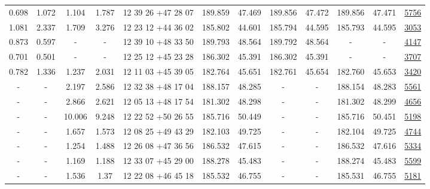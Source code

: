 \documentclass{article}
\begin{document}
\begin{landscape}
\begin{longtable}{c|c|c|c|c|c|c|c|c|c|c|c}
0.698 & 1.072 & 1.104 & 1.787 & 12 39 26 +47 28 07 &  189.859 & 47.469 &  189.856 & 47.472 & 189.856 & 47.471 & \href{http://banana.transientskp.org/r4/vlo_KmeulenSimSource/runningcatalog/5756}{5756}  \\
1.081 & 2.337 & 1.709 & 3.276 & 12 23 12 +44 36 02 &  185.802 & 44.601 &  185.794 & 44.595 & 185.793 & 44.595 & \href{http://banana.transientskp.org/r4/vlo_KmeulenSimSource/runningcatalog/3053}{3053}  \\
0.873 & 0.597 & - & - & 12 39 10 +48 33 50 &  189.793 & 48.564 &  189.792 & 48.564 & - & - & \href{http://banana.transientskp.org/r4/vlo_KmeulenSimSource/runningcatalog/4147}{4147}  \\
0.701 & 0.501 & - & - & 12 25 12 +45 23 28 &  186.302 & 45.391 &  186.302 & 45.391 & - & - & \href{http://banana.transientskp.org/r4/vlo_KmeulenSimSource/runningcatalog/3707}{3707}  \\
0.782 & 1.336 & 1.237 & 2.031 & 12 11 03 +45 39 05 &  182.764 & 45.651 &  182.761 & 45.654 & 182.760 & 45.653 & \href{http://banana.transientskp.org/r4/vlo_KmeulenSimSource/runningcatalog/3420}{3420}  \\
- & - & 2.197 & 2.586 & 12 32 38 +48 17 04 &  188.157 & 48.285 &  - & - & 188.154 & 48.283 & \href{http://banana.transientskp.org/r4/vlo_KmeulenSimSource/runningcatalog/5561}{5561}  \\
- & - & 2.866 & 2.621 & 12 05 13 +48 17 54 &  181.302 & 48.298 &  - & - & 181.302 & 48.299 & \href{http://banana.transientskp.org/r4/vlo_KmeulenSimSource/runningcatalog/4656}{4656}  \\
- & - & 10.006 & 9.248 & 12 22 52 +50 26 55 &  185.716 & 50.449 &  - & - & 185.716 & 50.451 & \href{http://banana.transientskp.org/r4/vlo_KmeulenSimSource/runningcatalog/5198}{5198}  \\
- & - & 1.657 & 1.573 & 12 08 25 +49 43 29 &  182.103 & 49.725 &  - & - & 182.104 & 49.725 & \href{http://banana.transientskp.org/r4/vlo_KmeulenSimSource/runningcatalog/4744}{4744}  \\
- & - & 1.254 & 1.488 & 12 26 08 +47 36 56 &  186.532 & 47.615 &  - & - & 186.532 & 47.616 & \href{http://banana.transientskp.org/r4/vlo_KmeulenSimSource/runningcatalog/5334}{5334}  \\
- & - & 1.169 & 1.188 & 12 33 07 +45 29 00 &  188.278 & 45.483 &  - & - & 188.274 & 45.483 & \href{http://banana.transientskp.org/r4/vlo_KmeulenSimSource/runningcatalog/5599}{5599}  \\
- & - & 1.536 & 1.37 & 12 22 08 +46 45 18 &  185.532 & 46.755 &  - & - & 185.531 & 46.755 & \href{http://banana.transientskp.org/r4/vlo_KmeulenSimSource/runningcatalog/5181}{5181}  \\

\end{longtable}
\end{landscape}
\end{document}
